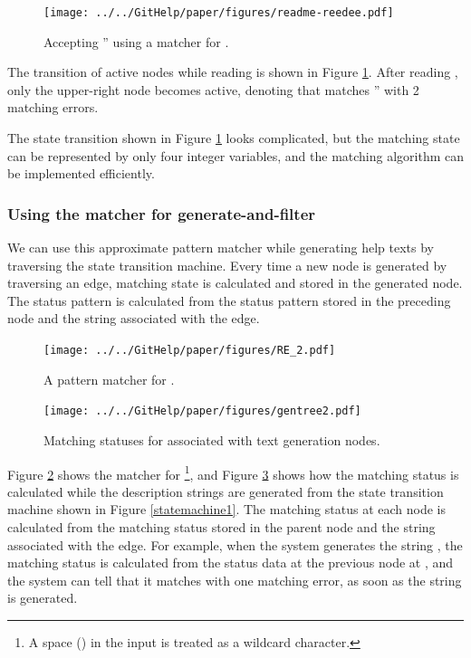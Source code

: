 \documentclass[manuscript,screen,review]{acmart}
\begin{document}
\begin{figure}[htb]
  \centerline{\texttt{[image: ../../GitHelp/paper/figures/readme-reedee.pdf]}}
  \caption{Accepting '' using a matcher for .}
  \label{readme-reedee}
\end{figure}

The transition of active nodes while reading
 is shown in Figure \ref{readme-reedee}.
After reading ,
only the upper-right node becomes active,
denoting that  matches
'' with 2 matching errors.

The state transition shown in 
Figure \ref{readme-reedee} looks complicated, but
the matching state can be represented by only four integer variables, and
the matching algorithm can be implemented efficiently.

\subsubsection{Using the matcher for generate-and-filter}

We can use this approximate pattern matcher while generating
help texts by traversing the state transition machine.
%
Every time a new node is generated by traversing an edge,
matching state is calculated and stored in the generated node.
The status pattern is calculated from the status pattern
stored in the preceding node and the string associated with the edge.

\begin{figure}[htb]
  \centerline{\texttt{[image: ../../GitHelp/paper/figures/RE\_2.pdf]}}
  \caption{A pattern matcher for .}
  \label{RE_2}
\end{figure}

\begin{figure}[bth]
\centerline{\texttt{[image: ../../GitHelp/paper/figures/gentree2.pdf]}}
\caption{Matching statuses for  associated with text generation nodes.}
\label{gentree2}
\end{figure}

Figure \ref{RE_2} shows the matcher for \footnote{
  A space (\qtt{ }) in the input is treated as a wildcard character.
},
and Figure \ref{gentree2} shows how the matching status is calculated while the
description strings are generated from the state transition machine
shown in Figure \ref{statemachine1}.
The matching status at each node is calculated from the matching status
stored in the parent node and the string associated with the edge.
For example, when the system generates the string
,
the matching status is calculated from the status data at the previous node at
, and
the system can tell that it matches  with one matching error,
as soon as the string is generated.
\end{document}

